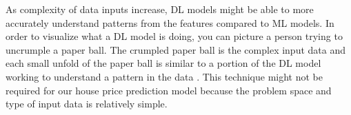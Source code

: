 As complexity of data inputs increase, DL models might be able to more accurately understand patterns from the features compared to ML models. In order to visualize what a DL model is doing, you can picture a person trying to uncrumple a paper ball. The crumpled paper ball is the complex input data and each small unfold of the paper ball is similar to a portion of the DL model working to understand a pattern in the data \cite{chollet-2021}. This technique might not be required for our house price prediction model because the problem space and type of input data is relatively simple.   
